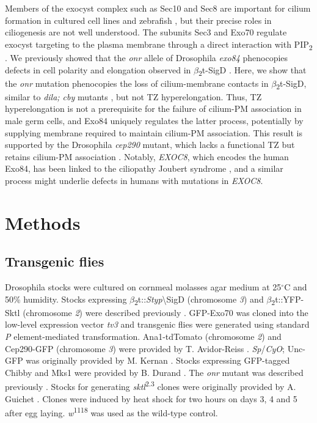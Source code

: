 \documentclass[12pt, twoside, letterpaper]{article}
\newcommand{\PIP}{PIP\textsubscript{2}}
\newcommand{\sigd}{$\beta$\textsubscript{2}t-SigD}
\begin{document}
\begin{doublespacing}
\begin{linenumbers}
    Members of the exocyst complex such as Sec10 and Sec8 are
    important for cilium formation in cultured cell lines and zebrafish
    \citep{zuo2009exocyst, lobo2017exocyst, seixas2016arl13b},
    but their precise roles in ciliogenesis are not well understood.
    The subunits Sec3 and Exo70 regulate exocyst targeting to the plasma
    membrane through a direct interaction with \PIP{}
    \citep{he2007exo70, zhang2008membrane}.
    We previously showed that
    the \textit{onr} allele of Drosophila \textit{exo84} phenocopies
    defects in cell polarity and elongation observed in \sigd{}
    \citep{fabian2010phosphatidylinositol}.
    Here, we show that the \textit{onr} mutation
    phenocopies the loss of cilium-membrane contacts in \sigd{}, similar to
    \textit{dila; cby} mutants \citep{vieillard2016transition},
    but not TZ hyperelongation.
    Thus, TZ hyperelongation is not a prerequisite for the failure of
    cilium-PM association in male germ cells,
    and Exo84 uniquely regulates the latter process,
    potentially by supplying membrane required to maintain cilium-PM
    association.
    This result is supported by the Drosophila \textit{cep290} mutant,
    which lacks a functional TZ but retains cilium-PM
    association \cite{basiri2014migrating}.
    Notably, \textit{EXOC8}, which encodes the human Exo84, has
    been linked to the ciliopathy Joubert syndrome
    \citep{dixon2012exome},
    and a similar process might underlie defects in humans with
    mutations in \textit{EXOC8}.

    \section*{Methods}
    \subsection*{Transgenic flies}
    Drosophila stocks were cultured on cornmeal molasses agar medium at 25$^{\circ}$C
    and 50\% humidity.
    Stocks expressing $\beta$\textsubscript{2}t::\textit{Styp}\textbackslash{SigD} (chromosome \textit{3}) and
    $\beta$\textsubscript{2}t::YFP-Sktl (chromosome \textit{2}) were described previously \citep{wei2008depletion, wong2005pip2}.
    GFP-Exo70 was cloned into the low-level expression vector \textit{tv3} \citep{wong2005pip2}
    and transgenic flies were generated using standard \textit{P} element-mediated transformation.
    Ana1-tdTomato (chromosome \textit{2}) and Cep290-GFP (chromosome \textit{3}) were provided
    by T. Avidor-Reiss \citep{basiri2014migrating}.
    \textit{Sp}/\textit{CyO}; Unc-GFP was originally provided by M. Kernan \citep{baker2004mechanosensory}.
    Stocks expressing GFP-tagged Chibby and Mks1 were
    provided by B. Durand \citep{enjolras2012drosophila, vieillard2016transition}.
    The \textit{onr} mutant was described previously \citep{giansanti2015exocyst}.
    Stocks for generating \textit{sktl}\textsuperscript{2.3} clones were originally provided by
    A. Guichet \citep{gervais2008pip5k}.
    Clones were induced by heat shock for two hours on days 3, 4 and 5 after egg laying.
    \textit{w}\textsuperscript{1118} was used as the wild-type control.


\end{linenumbers}
\end{doublespacing}
\end{document}
